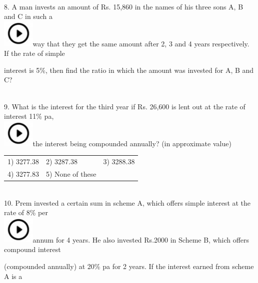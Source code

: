 \documentclass{article}
\begin{document}
	\noindent 
	
	\noindent  \\  
	
	8.   A man invests an amount of Rs. 15,860 in the names of his three sons A, B and C in such a \noindent \\ \includegraphics*[width=0.60in, height=0.52in]{images/image1}way that they get the same amount after 2, 3 and 4 years respectively. If the rate of simple
	
	\noindent interest is 5\%, then find the ratio in which the amount was invested for A, B and C?
	
	\noindent  \\  
	
	9.   What is the interest for the third year if Rs. 26,600 is lent out at the rate of interest 11\% pa, \noindent \\ \includegraphics*[width=0.60in, height=0.52in]{images/image1}the interest being compounded annually? (in approximate value)
	
	\noindent \begin{tabular}{p{1.7in} p{1.6in} p{1.6in}} \\ 
 1) 3277.38               & 2) 3287.38        & 3) 3288.38        \\
4) 3277.83        & 5) None of these  \\
\end{tabular}
	
	\noindent  \\  
	
	10. Prem invested a certain sum in scheme A, which offers simple interest at the rate of 8\% per \noindent \\ \includegraphics*[width=0.60in, height=0.52in]{images/image1}annum for 4 years. He also invested Rs.2000 in Scheme B, which offers compound interest
	
	\noindent (compounded annually) at 20\% pa for 2 years.  If the interest     earned from scheme A is a
	
\end{document}
